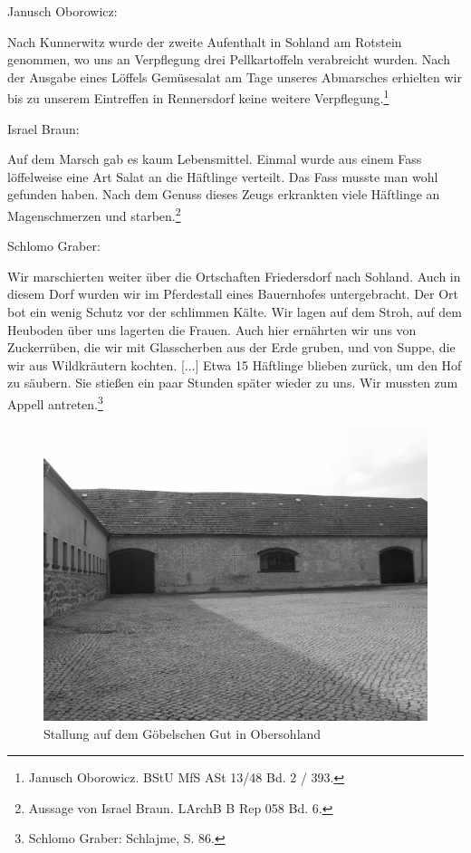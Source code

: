 Janusch Oborowicz:
\begin{leftbar}   
Nach Kunnerwitz wurde der zweite Aufenthalt in Sohland am Rotstein genommen, wo uns an Verpflegung drei Pellkartoffeln verabreicht wurden. Nach der Ausgabe eines Löffels Gemüsesalat am Tage unseres Abmarsches erhielten wir bis zu unserem Eintreffen in Rennersdorf keine weitere Verpflegung.\footnote{Janusch Oborowicz. BStU MfS ASt 13/48 Bd. 2 / 393. }
\end{leftbar}
Israel Braun:
\begin{leftbar}   
Auf dem Marsch gab es kaum Lebensmittel. Einmal wurde aus einem Fass löffelweise eine Art Salat an die Häftlinge verteilt. Das Fass musste man wohl gefunden haben. Nach dem Genuss dieses Zeugs erkrankten viele Häftlinge an Magenschmerzen und starben.\footnote{Aussage von Israel Braun. LArchB B Rep 058 Bd. 6.}
\end{leftbar}

\newpage
Schlomo Graber:
\begin{leftbar}   
Wir marschierten weiter über die Ortschaften Friedersdorf nach Sohland. Auch in diesem Dorf wurden wir im Pferdestall eines Bauernhofes untergebracht. Der Ort bot ein wenig Schutz vor der schlimmen Kälte. Wir lagen auf dem Stroh, auf dem Heuboden über uns lagerten die Frauen. Auch hier ernährten wir uns von Zuckerrüben, die wir mit Glasscherben aus der Erde gruben, und von Suppe, die wir aus Wildkräutern kochten. [...] Etwa 15 Häftlinge blieben zurück, um den Hof zu säubern. Sie stießen ein paar Stunden später wieder zu uns. Wir mussten zum Appell antreten.\footnote{Schlomo Graber: Schlajme, S. 86.}
\end{leftbar}


\begin{figure}[htb]
    \includegraphics[width=\linewidth]{images/tm_goebel.jpg}
    \caption[Göbel's Scheune in Obersohland]{Stallung auf dem Göbelschen\protect{} Gut in Obersohland\protect{}}
    \label{goebelscheune}
\end{figure}

